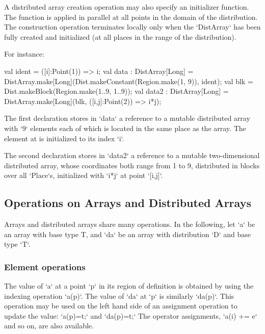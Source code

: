 \begin{ex}A distributed array creation operation may also specify an initializer
function.
The function is applied in parallel
at all points in the domain of the distribution. The
construction operation terminates locally only when the \xcd`DistArray` has been
fully created and initialized (at all places in the range of the
distribution).

For instance:
\begin{xten}
val ident = ([i]:Point(1)) => i;
val data : DistArray[Long]
    = DistArray.make[Long](Dist.makeConstant(Region.make(1, 9)), ident);
val blk = Dist.makeBlock(Region.make(1..9, 1..9));
val data2 : DistArray[Long]
    = DistArray.make[Long](blk, ([i,j]:Point(2)) => i*j);
\end{xten}

{}\noindent 
The first declaration stores in \xcd`data` a reference to a mutable
distributed array with \xcd`9` elements each of which is located in the
same place as the array. The element at \Xcd{[i]} is initialized to its index
\xcd`i`. 

The second declaration stores in \xcd`data2` a reference to a mutable
two-dimensional distributed array, whose coordinates both range from 1 to
9, distributed in blocks over all \xcd`Place`s, 
initialized with \xcd`i*j`
at point \xcd`[i,j]`.
\end{ex}

\subsection{Operations on Arrays and Distributed Arrays}

Arrays and distributed arrays share many operations.
In the following, let \xcd`a` be an array with base type T, and \xcd`da` be an
array with distribution \xcd`D` and base type \xcd`T`.

\subsubsection{Element operations}
The value of \xcd`a` at a point \xcd`p` in its region of definition is
obtained by using the indexing operation \xcd`a(p)`. 
The value of \xcd`da` at \xcd`p` is similarly
\xcd`da(p)`.
This operation
may be used on the left hand side of an assignment operation to update
the value: 
\xcd`a(p)=t;`
and 
\xcd`da(p)=t;`
The operator assignments, \xcd`a(i) += e` and so on,  are also
available. 

